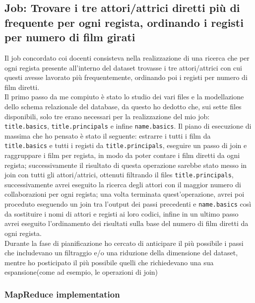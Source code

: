 \documentclass[hidelinks]{article}
\begin{document}
\subsection{Job: Trovare i tre attori/attrici diretti più di frequente per ogni regista, ordinando i registi per numero di film girati}

Il job concordato coi docenti consisteva nella realizzazione di una ricerca che per ogni regista presente all'interno del dataset trovasse i tre attori/attrici con cui questi avesse lavorato più frequentemente, ordinando poi i registi per numero di film diretti.\\
Il primo passo da me compiuto è stato lo studio dei vari files e la modellazione dello schema relazionale del database, da questo ho dedotto che, sui sette files disponibili, solo tre erano necessari per la realizzazione del mio job: \texttt{title.basics}, \texttt{title.principals} e infine \texttt{name.basics}.
Il piano di esecuzione di massima che ho pensato è stato il seguente: estrarre i tutti i film da \texttt{title.basics} e tutti i registi da \texttt{title.principals}, eseguire un passo di join e raggruppare i film per regista, in modo da poter contare i film diretti da ogni regista; successivamente il risultato di questa operazione sarebbe stato messo in join con tutti gli attori/attrici, ottenuti filtrando il files \texttt{title.principals}, successivamente avrei eseguito la ricerca degli attori con il maggior numero di collaborazioni per ogni regista; una volta terminata quest'operazione, avrei poi proceduto eseguendo un join tra l'output dei passi precedenti e \texttt{name.basics} così da sostituire i nomi di attori e registi ai loro codici, infine in un ultimo passo avrei eseguito l'ordinamento dei risultati sulla base del numero di
film diretti da ogni regista.\\
Durante la fase di pianificazione ho cercato di anticipare il più possibile i passi che includevano un filtraggio e/o una riduzione della dimensione del dataset, mentre ho posticipato il più possibile quelli che richiedevano una sua espansione(come ad esempio, le operazioni di join) 

\subsubsection{MapReduce implementation}
\end{document}

